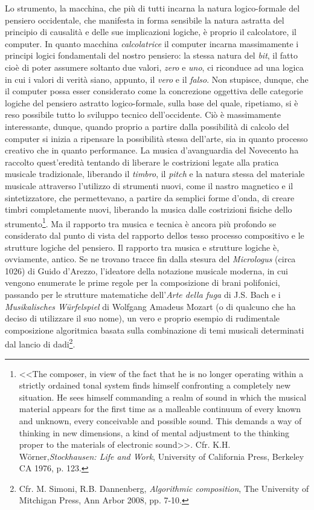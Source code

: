 \documentclass[a4paper,12pt]{scrartcl}
\begin{document}
	Lo strumento, la macchina, che più di tutti incarna la natura logico-formale del pensiero occidentale, che manifesta in forma sensibile la natura astratta del principio di causalità e delle sue implicazioni logiche, è proprio il calcolatore, il computer. In quanto macchina \emph{calcolatrice} il computer incarna massimamente i principi logici fondamentali del nostro pensiero: la stessa natura del \emph{bit}, il fatto cioè di poter assumere soltanto due valori, \emph{zero} e \emph{uno}, ci riconduce ad una logica in cui i valori di verità siano, appunto, il \emph{vero} e il \emph{falso}. Non stupisce, dunque, che il computer possa esser considerato come la concrezione oggettiva delle categorie logiche del pensiero astratto logico-formale, sulla base del quale, ripetiamo, si è reso possibile tutto lo sviluppo tecnico dell'occidente. Ciò è massimamente interessante, dunque, quando proprio a partire dalla possibilità di calcolo del computer si inizia a ripensare la possibilità stessa dell'arte, sia in quanto processo creativo che in quanto performance. La musica d'avanguardia del Novecento ha raccolto quest'eredità tentando di liberare le costrizioni legate alla pratica musicale tradizionale, liberando il \emph{timbro}, il \emph{pitch} e la natura stessa del materiale musicale attraverso l'utilizzo di strumenti nuovi, come il nastro magnetico e il sintetizzatore, che permettevano, a partire da semplici forme d'onda, di creare timbri completamente nuovi, liberando la musica dalle costrizioni fisiche dello strumento\footnote{<<The composer, in view of the fact that he is no longer operating within a strictly ordained tonal system finds himself confronting a completely new situation. He sees himself commanding a realm of sound in which the musical material appears for the first time as a malleable continuum of every known and unknown, every conceivable and possible sound. This demands a way of thinking in new dimensions, a kind of mental adjustment to the thinking proper to the materials of electronic sound>>. Cfr. K.H. W{\"o}rner,\textit{Stockhausen: Life and Work}, University of California Press, Berkeley CA 1976, p. 123.}.
	Ma il rapporto tra musica e tecnica è ancora più profondo se considerato dal punto di vista del rapporto dellos tesso processo compositivo e le strutture logiche del pensiero. Il rapporto tra musica e strutture logiche è, ovviamente, antico. Se ne trovano tracce fin dalla stesura del \emph{Micrologus} (circa 1026) di Guido d'Arezzo, l'ideatore della notazione musicale moderna, in cui vengono enumerate le prime regole per la composizione di brani polifonici, passando per le strutture matematiche dell'\emph{Arte della fuga} di J.S. Bach e i \emph{Musikalisches W{\"u}rfelspiel} di Wolfgang Amadeus Mozart (o di qualcuno che ha deciso di utilizzare il suo nome), un vero e proprio esempio di rudimentale composizione algoritmica basata sulla combinazione di temi musicali determinati dal lancio di dadi\footnote{Cfr. M. Simoni, R.B. Dannenberg, \textit{Algorithmic composition}, The University of Mitchigan Press, Ann Arbor 2008, pp. 7-10.}. 
\end{document}
